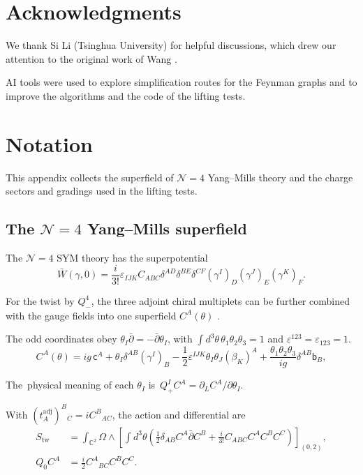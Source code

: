\documentclass[11pt]{article}
\numberwithin{equation}{section}
\numberwithin{figure}{section}
\numberwithin{table}{section}
\begin{document}
\section*{Acknowledgments}\label{sec-acknowledgments}

We thank Si Li (Tsinghua University) for helpful discussions, which drew our attention to the original work of Wang \cite{Wang}.

AI tools were used to explore simplification routes for the Feynman graphs and to improve the algorithms and the code of the lifting tests.

\appendix

\section{Notation}\label{sec-notation}

This appendix collects the superfield of $\mathcal N=4$ Yang--Mills theory and the charge sectors and gradings used in the lifting tests.

\subsection{The $\mathcal N=4$ Yang--Mills superfield}\label{sec-N4-superfield}

The $\mathcal N=4$ SYM theory has the superpotential
\begin{equation}\label{b-01022}
\bar W(\gamma,0)=\frac i{3!}\varepsilon_{IJK}C_{ABC}
\delta^{AD}\delta^{BE}\delta^{CF}(\gamma^I)_D(\gamma^J)_E(\gamma^K)_F.
\end{equation}

For the twist by $Q_-^4$, the three adjoint chiral multiplets can be further combined with the gauge fields into one superfield $C^A(\theta)$ \cite{ChangYin,BK}.

The odd coordinates obey $\theta_I\bar\partial=-\bar\partial\theta_I$, with $\int d^3\theta\,\theta_1\theta_2\theta_3=1$ and $\varepsilon^{123}=\varepsilon_{123}=1$.
\begin{equation}\label{eq-A-13}
C^A(\theta)=ig\,\mathsf c^A+\theta_I\delta^{AB}(\gamma^I)_B-\frac12\varepsilon^{IJK}\theta_I\theta_J(\beta_K)^A+\frac{\theta_1\theta_2\theta_3}{ig}\delta^{AB}\mathsf b_B,
\end{equation}

The~physical meaning of each $\theta_I$ is~$Q_+^I C^A=\partial_L C^A/\partial\theta_I$.

With $(t_A^{\mathrm{adj}})^B{}_C=iC^B{}_{AC}$, the action and differential are
\begin{equation}\label{eq-A-15}
\begin{aligned}
S_{\mathrm{tw}}
&=\int_{\mathbb C^2}\Omega\wedge
\left[\int d^3\theta\left(
\frac12\delta_{AB}C^A\bar\partial C^B
+\frac{i}{3!}C_{ABC}C^AC^BC^C\right)\right]_{(0,2)},\\
Q_0C^A&=\frac i2C^A{}_{BC}C^BC^C.
\end{aligned}
\end{equation}
\end{document}
